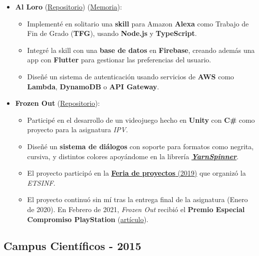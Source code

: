 \documentclass[letterpaper, 12pt, dvipsnames]{article}
\begin{document}
\begin{itemize}
    \item \textbf{Al Loro} (\href{https://github.com/algono/FeedTheParrot-RSS}{Repositorio}) (\href{http://hdl.handle.net/10251/174256}{Memoria}):
          \begin{itemize}
              \item Implementé en solitario una \textbf{skill} para Amazon \textbf{Alexa} como Trabajo de Fin de Grado (\textbf{TFG}), usando \textbf{Node.js} y \textbf{TypeScript}.
              \item Integré la skill con una \textbf{base de datos} en \textbf{Firebase}, creando además una app con \textbf{Flutter} para gestionar las preferencias del usuario.
              \item Diseñé un sistema de autenticación usando servicios de \textbf{AWS} como \textbf{Lambda}, \textbf{DynamoDB} o \textbf{API Gateway}.
          \end{itemize}
    \item \textbf{Frozen Out} (\href{https://github.com/Freezer-Games/Frozen-Out}{Repositorio}):
          \begin{itemize}
              \item Participé en el desarrollo de un videojuego hecho en \textbf{Unity} con \textbf{C\#} como proyecto para la asignatura \emph{IPV}.
              \item Diseñé un \textbf{sistema de diálogos} con soporte para formatos como negrita, cursiva, y distintos colores apoyándome en la librería \href{https://yarnspinner.dev/}{\textbf{\emph{YarnSpinner}}}.
              \item El proyecto participó en la \href{https://es-es.facebook.com/etsinf/videos/feria-de-proyectos-de-estudiantes-2019/1921312964681641/}{\textbf{Feria de proyectos} (2019)} que organizó la \emph{ETSINF}.
              \item El proyecto continuó sin mí tras la entrega final de la asignatura (Enero de 2020). En Febrero de 2021, \emph{Frozen Out} recibió el \textbf{Premio Especial Compromiso PlayStation} (\href{https://www.inf.upv.es/www/etsinf/es/premio-especial-compromiso-playstation-para-el-videojuego-frozen-out-creado-por-estudiantes-de-la-etsinf-y-la-facultat-de-bb-aa/}{artículo}).
          \end{itemize}
\end{itemize}

\subsection*{Campus Científicos - 2015}
\end{document}
